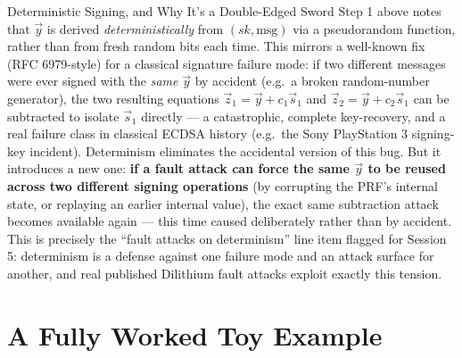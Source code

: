 \begin{factbox}{Deterministic Signing, and Why It's a Double-Edged Sword}
Step 1 above notes that $\vec y$ is derived \emph{deterministically} from $(sk, \text{msg})$ via a pseudorandom function, rather than from fresh random bits each time. This mirrors a well-known fix (RFC 6979-style) for a classical signature failure mode: if two different messages were ever signed with the \emph{same} $\vec y$ by accident (e.g.\ a broken random-number generator), the two resulting equations $\vec z_1 = \vec y + c_1\vec s_1$ and $\vec z_2 = \vec y + c_2\vec s_1$ can be subtracted to isolate $\vec s_1$ directly --- a catastrophic, complete key-recovery, and a real failure class in classical ECDSA history (e.g.\ the Sony PlayStation 3 signing-key incident). Determinism eliminates the accidental version of this bug. But it introduces a new one: \textbf{if a fault attack can force the same $\vec y$ to be reused across two different signing operations} (by corrupting the PRF's internal state, or replaying an earlier internal value), the exact same subtraction attack becomes available again --- this time caused deliberately rather than by accident. This is precisely the ``fault attacks on determinism'' line item flagged for Session 5: determinism is a defense against one failure mode and an attack surface for another, and real published Dilithium fault attacks exploit exactly this tension.
\end{factbox}

\section{A Fully Worked Toy Example}
\label{sec:L4:a-fully-worked-toy-example}

